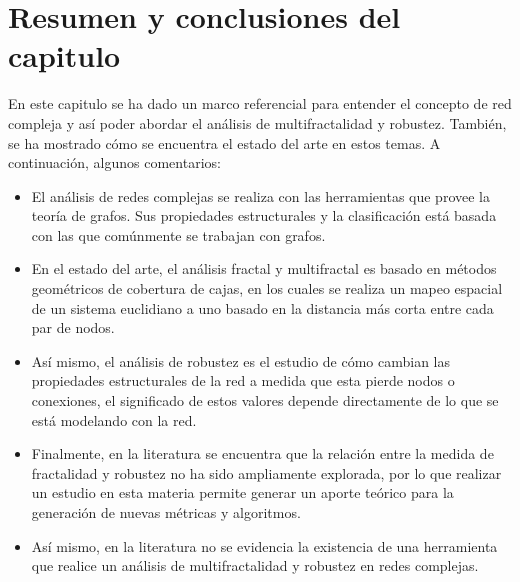 \newpage
\section{Resumen y conclusiones del capitulo}

En este capitulo se ha dado un marco referencial para entender el concepto de red compleja y así poder abordar el análisis de multifractalidad y robustez. También, se ha mostrado cómo se encuentra el estado del arte en estos temas. A continuación, algunos comentarios:

\begin{itemize}
    \item El análisis de redes complejas se realiza con las herramientas que provee la teoría de grafos. Sus propiedades estructurales y la clasificación está basada con las que comúnmente se trabajan con grafos.
    \item En el estado del arte, el análisis fractal y multifractal es basado en métodos geométricos de cobertura de cajas, en los cuales se realiza un mapeo espacial de un sistema euclidiano a uno basado en la distancia más corta entre cada par de nodos.
    \item Así mismo, el análisis de robustez es el estudio de cómo cambian las propiedades estructurales de la red a medida que esta pierde nodos o conexiones, el significado de estos valores depende directamente de lo que se está modelando con la red.
    \item Finalmente, en la literatura se encuentra que la relación entre la medida de fractalidad y robustez no ha sido ampliamente explorada, por lo que realizar un estudio en esta materia permite generar un aporte teórico para la generación de nuevas métricas y algoritmos.
    \item Así mismo, en la literatura no se evidencia la existencia de una herramienta que realice un análisis de multifractalidad y robustez en redes complejas.
\end{itemize}